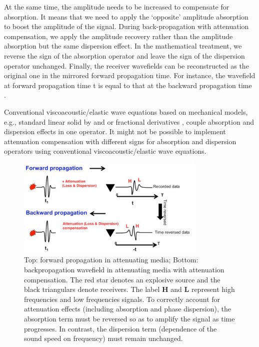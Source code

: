 At the same time, the amplitude needs to be increased to compensate for absorption. It means that we need to apply the ‘opposite’ amplitude absorption to boost the amplitude of the signal. During back-propagation with attenuation compensation, we apply the amplitude recovery rather than the amplitude absorption but the same dispersion effect. In the mathematical treatment, we reverse the sign of the absorption operator and leave the sign of the dispersion operator unchanged. Finally, the receiver wavefields can be reconstructed as the original one in the mirrored forward propagation time. For instance, the wavefield at forward propagation time t is equal to that at the backward propagation time  . 

Conventional viscoacoustic/elastic wave equations based on mechanical models, e.g., standard linear solid by \citet[]{carcione1988} and \citet[]{zhu13} or fractional derivatives \citep{carcione2002, carcione2010}, couple absorption and dispersion effects in one operator. It might not be possible to implement attenuation compensation with different signs for absorption and dispersion operators using conventional viscoacoustic/elastic wave equations.

 \begin{figure}[!htb]
   \centering
   \includegraphics[width=0.8\textwidth]{Fig/fig1}
   \caption{Top: forward propagation in attenuating media; Bottom: backpropagation wavefield in attenuating media with attenuation compensation. The red star denotes an explosive source and the black triangulars denote receivers. The label \textbf{H} and \textbf{L} represent high frequencies and low frequencies signals. To correctly account for attenuation effects (including absorption and phase dispersion), the absorption term must be reversed so as to amplify the signal as time progresses. In contrast, the dispersion term (dependence of the sound speed on frequency) must remain unchanged.}
 \end{figure}

